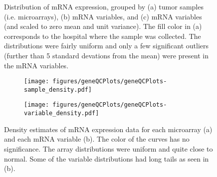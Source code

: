 \begin{figure}
	\centering
	\begin{subfigure}{1\textwidth}
		\centering
	\end{subfigure}
	\begin{subfigure}{1\textwidth}
		\centering
	\end{subfigure}
	\begin{subfigure}{1\textwidth}
		\centering
	\end{subfigure}

	\caption{Distribution of mRNA expression, grouped by
	(a) tumor samples (i.e. microarrays),
	(b) mRNA variables, 
	and (c) mRNA variables (and scaled to zero mean and unit variance).
	The fill color in (a) corresponds to the hospital where the sample was collected.
	The distributions were fairly uniform and only a few significant outliers (further than
	5 standard devations from the mean) were present in the mRNA variables.}
	\label{fig:qc-mrna-boxplot}
\end{figure}


\begin{figure}[!h]
	\centering
	\begin{subfigure}{.49\textwidth}
		\texttt{[image: figures/geneQCPlots/geneQCPlots-sample\_density.pdf]}
	\end{subfigure}
	\begin{subfigure}{.49\textwidth}
		\texttt{[image: figures/geneQCPlots/geneQCPlots-variable\_density.pdf]}
	\end{subfigure}

	\caption{Density estimates of mRNA expression data for each microarray (a)
	and each mRNA variable (b). The color of the curves has no significance.
	The array distributions were uniform and quite close to normal. Some of the variable distributions
	had long tails as seen in (b).}
	\label{fig:qc-mrna-density}
\end{figure}


